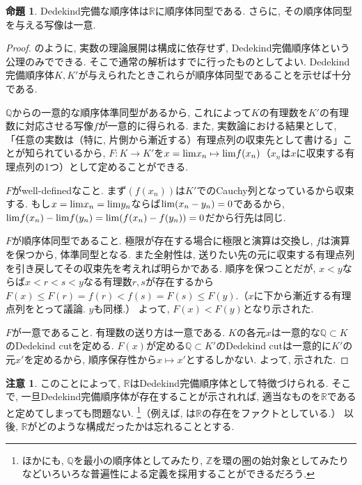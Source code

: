 \documentclass[a4paper, twoside]{bxjsarticle}
\newcommand{\zah}{\mathbb{Z}}
\newcommand{\quo}{\mathbb{Q}}
\newcommand{\rea}{\mathbb{R}}
\theoremstyle{definition}
\newtheorem{prop}[thm]{命題}
\newtheorem{rem}[thm]{注意}
\begin{document}
        \begin{prop}
            Dedekind完備な順序体は$\rea$に順序体同型である. さらに, その順序体同型を与える写像は一意.
        \end{prop}
        \begin{proof}
            \cite{sugiura}のように, 実数の理論展開は構成に依存せず, Dedekind完備順序体という公理のみでできる. そこで通常の解析はすでに行ったものとしてよい. Dedekind完備順序体$K, K'$が与えられたときこれらが順序体同型であることを示せば十分である.
            
            $\quo$からの一意的な順序体準同型があるから, これによって$K$の有理数を$K'$の有理数に対応させる写像$f$が一意的に得られる. また, 実数論における結果として, 「任意の実数は（特に, 片側から漸近する）有理点列の収束先として書ける」ことが知られているから, $F\colon K\to K'$を$x={\rm lim}x_n\mapsto {\rm lim}f(x_n)$（$x_n$は$x$に収束する有理点列の1つ）として定めることができる.
            
            $F$がwell-definedなこと. まず$(f(x_n))$は$K'$でのCauchy列となっているから収束する. もし$x={\rm lim}x_n ={\rm lim}y_n$ならば${\rm lim}(x_n-y_n)=0$であるから, ${\rm lim}f(x_n)-{\rm lim}f(y_n)={\rm lim}(f(x_n)-f(y_n))=0$だから行先は同じ.
            
            $F$が順序体同型であること. 極限が存在する場合に極限と演算は交換し, $f$は演算を保つから, 体準同型となる. また全射性は, 送りたい先の元に収束する有理点列を引き戻してその収束先を考えれば明らかである. 順序を保つことだが, $x<y$ならば$x<r<s<y$なる有理数$r, s$が存在するから$F(x)\leq F(r)=f(r)<f(s)=F(s)\leq F(y)$.（$x$に下から漸近する有理点列をとって議論. $y$も同様.） よって, $F(x)<F(y)$となり示された.
            
            $F$が一意であること. 有理数の送り方は一意である. $K$の各元$x$は一意的な$\quo\subset K$のDedekind cutを定める. $F(x)$が定める$\quo\subset K'$のDedekind cutは一意的に$K'$の元$x'$を定めるから, 順序保存性から$x\mapsto x'$とするしかない. よって, 示された.
        \end{proof}
        \begin{rem}
            このことによって, $\rea$はDedekind完備順序体として特徴づけられる. そこで, 一旦Dedekind完備順序体が存在することが示されれば, 適当なものを$\rea$であると定めてしまっても問題ない. \footnote{ほかにも, $\quo$を最小の順序体としてみたり, $\zah$を環の圏の始対象としてみたりなどいろいろな普遍性による定義を採用することができるだろう.}（例えば, \cite{sugiura}は$\rea$の存在をファクトとしている.） 以後, $\rea$がどのような構成だったかは忘れることとする. 
        \end{rem}
        
\end{document}
